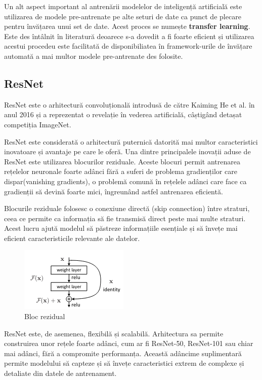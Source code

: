 Un alt aspect important al antrenării modelelor de inteligență artificială este utilizarea de modele pre-antrenate pe alte seturi de date ca punct de plecare pentru învățarea unui set de date. Acest proces se numește \textbf{transfer learning}. Este des întâlnit în literatură deoarece s-a dovedit a fi foarte eficient și utilizarea acestui procedeu este facilitată de disponibiliatea în framework-urile de învățare automată a mai multor modele pre-antrenate des folosite. 

\subsection{ResNet}

ResNet este o arhitectură convoluțională introdusă de către Kaiming He et al. în anul 2016\cite{he2016deep} și a reprezentat o revelație în vederea artificială, câștigând detașat competiția ImageNet. 

ResNet este considerată o arhitectură puternică datorită mai multor caracteristici inovatoare și avantaje pe care le oferă. Una dintre principalele inovații aduse de ResNet este utilizarea blocurilor reziduale. Aceste blocuri permit antrenarea rețelelor neuronale foarte adânci fără a suferi de problema gradienților care dispar(vanishing gradients), o problemă comună în rețelele adânci care face ca gradienții să devină foarte mici, îngreunând astfel antrenarea eficientă.

Blocurile reziduale folosesc o conexiune directă (skip connection) între straturi, ceea ce permite ca informația să fie transmisă direct peste mai multe straturi. Acest lucru ajută modelul să păstreze informațiile esențiale și să învețe mai eficient caracteristicile relevante ale datelor. 

\begin{figure}[ht]
         \centering 
         \includegraphics[width=0.3\linewidth]{images/bloc_rezidual.png}
         \captionsetup{font=footnotesize}
     \caption{Bloc rezidual\cite{he2016deep}} 
\end{figure}

ResNet este, de asemenea, flexibilă și scalabilă. Arhitectura sa permite construirea unor rețele foarte adânci, cum ar fi ResNet-50, ResNet-101 sau chiar mai adânci, fără a compromite performanța. Această adâncime suplimentară permite modelului să capteze și să învețe caracteristici extrem de complexe și detaliate din datele de antrenament.

